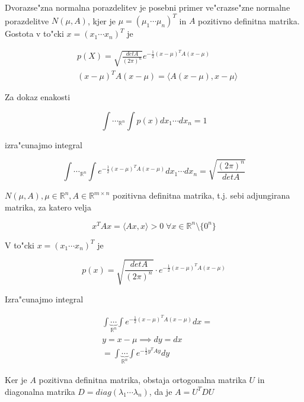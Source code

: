 \documentclass[a4paper,12pt]{article}
\theoremstyle{definition}
\theoremstyle{remark}
\newcommand{\R}{\mathbb{R}}
\begin{document}
Dvorazse"zna normalna porazdelitev je posebni primer ve"crazse"zne normalne porazdelitve $N(\mu, A)$, kjer je
$\mu = (\mu_1 \cdots \mu_n)^T$ in $A$ pozitivno definitna matrika. \\
Gostota v to"cki $x = (x_1 \cdots x_n)^T$ je

\begin{align*}
    &p(X) = \sqrt{\frac{det A}{(2\pi)^n}} e^{-\frac{1}{2} (x-\mu)^T A (x-\mu)} \\
    &(x-\mu)^T A (x-\mu) = \langle A(x-\mu), x-\mu \rangle
\end{align*}

Za dokaz enakosti

\begin{equation*}
    \int \cdots_{\R^n} \int p(x) dx_1 \cdots dx_n = 1
\end{equation*}

izra"cunajmo integral

\begin{equation*}
    \int \cdots_{\R^n} \int e^{-\frac{1}{2} (x-\mu)^T A (x-\mu)} dx_1 \cdots dx_n =
    \sqrt{\frac{(2\pi)^n}{det A}}
\end{equation*}




$N(\mu, A), \mu \in \R^n, A \in \R^{m \times n}$ pozitivna definitna matrika, t.j. sebi adjungirana matrika,
za katero velja

\begin{equation*}
    x^T A x = \langle Ax, x \rangle > 0 \; \forall x \in \R^n \text{\textbackslash} \{0^n\}
\end{equation*}

V to"cki $x = (x_1 \cdots x_n)^T$ je

\begin{equation*}
    p(x) = \sqrt{\frac{detA}{(2\pi)^n}} \cdot e^{-\frac{1}{2} (x-\mu)^T A (x-\mu)}
\end{equation*}

Izra"cunajmo integral

\begin{align*}
    &\int \underbrace{\cdots}_{\R^n} \int e^{-\frac{1}{2} (x-\mu)^T A (x-\mu)} dx = \\
    &y = x - \mu \implies dy = dx \\
    &= \int \underbrace{\cdots}_{\R^n} \int e^{-\frac{1}{2} y^T A y} dy
\end{align*}

Ker je $A$ pozitivna definitna matrika, obstaja ortogonalna matrika $U$ in diagonalna matrika
$D = diag(\lambda_1 \cdots \lambda_n)$, da je $A = U^T D U$
\end{document}
